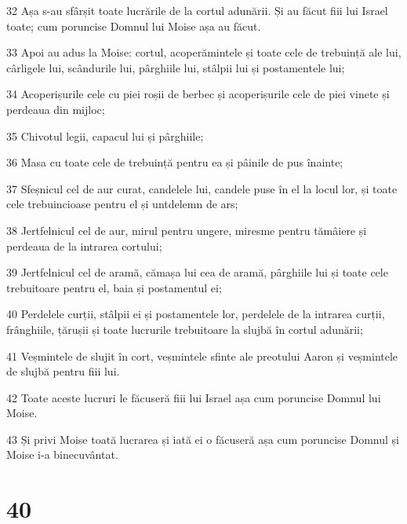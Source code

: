 \par 32 Așa s-au sfârșit toate lucrările de la cortul adunării. Și au făcut fiii lui Israel toate; cum poruncise Domnul lui Moise așa au făcut.
\par 33 Apoi au adus la Moise: cortul, acoperămintele și toate cele de trebuință ale lui, cârligele lui, scândurile lui, pârghiile lui, stâlpii lui și postamentele lui;
\par 34 Acoperișurile cele cu piei roșii de berbec și acoperișurile cele de piei vinete și perdeaua din mijloc;
\par 35 Chivotul legii, capacul lui și pârghiile;
\par 36 Masa cu toate cele de trebuință pentru ea și pâinile de pus înainte;
\par 37 Sfeșnicul cel de aur curat, candelele lui, candele puse în el la locul lor, și toate cele trebuincioase pentru el și untdelemn de ars;
\par 38 Jertfelnicul cel de aur, mirul pentru ungere, miresme pentru tămâiere și perdeaua de la intrarea cortului;
\par 39 Jertfelnicul cel de aramă, cămașa lui cea de aramă, pârghiile lui și toate cele trebuitoare pentru el, baia și postamentul ei;
\par 40 Perdelele curții, stâlpii ei și postamentele lor, perdelele de la intrarea curții, frânghiile, țărușii și toate lucrurile trebuitoare la slujbă în cortul adunării;
\par 41 Veșmintele de slujit în cort, veșmintele sfinte ale preotului Aaron și veșmintele de slujbă pentru fiii lui.
\par 42 Toate aceste lucruri le făcuseră fiii lui Israel așa cum poruncise Domnul lui Moise.
\par 43 Și privi Moise toată lucrarea și iată ei o făcuseră așa cum poruncise Domnul și Moise i-a binecuvântat.

\chapter{40}

